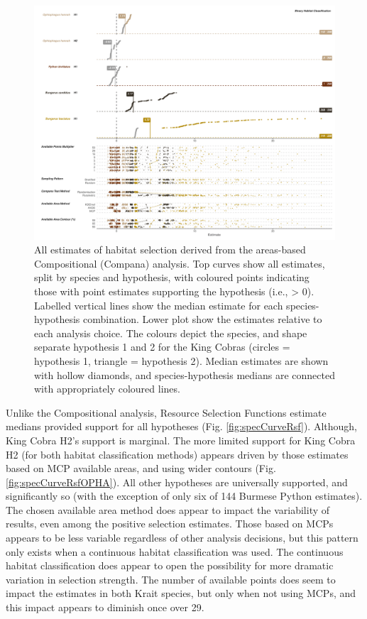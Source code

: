 \documentclass[10pt,a4paper]{article}
\begin{document}
\begin{figure}
\includegraphics[width=1\linewidth]{../../figures/specCurve_area} \caption{All estimates of habitat selection derived from the areas-based Compositional (Compana) analysis. Top curves show all estimates, split by species and hypothesis, with coloured points indicating those with point estimates supporting the hypothesis (i.e., > 0). Labelled vertical lines show the median estimate for each species-hypothesis combination. Lower plot show the estimates relative to each analysis choice. The colours depict the species, and shape separate hypothesis 1 and 2 for the King Cobras (circles = hypothesis 1, triangle = hypothesis 2). Median estimates are shown with hollow diamonds, and species-hypothesis medians are connected with appropriately coloured lines.}\label{fig:specCurveArea}
\end{figure}

Unlike the Compositional analysis, Resource Selection Functions estimate medians provided support for all hypotheses (Fig. \ref{fig:specCurveRsf}).
Although, King Cobra H2's support is marginal.
The more limited support for King Cobra H2 (for both habitat classification methods) appears driven by those estimates based on MCP available areas, and using wider contours (Fig. \ref{fig:specCurveRsfOPHA}).
All other hypotheses are universally supported, and significantly so (with the exception of only six of 144 Burmese Python estimates).
The chosen available area method does appear to impact the variability of results, even among the positive selection estimates.
Those based on MCPs appears to be less variable regardless of other analysis decisions, but this pattern only exists when a continuous habitat classification was used.
The continuous habitat classification does appear to open the possibility for more dramatic variation in selection strength.
The number of available points does seem to impact the estimates in both Krait species, but only when not using MCPs, and this impact appears to diminish once over 29.
\end{document}
